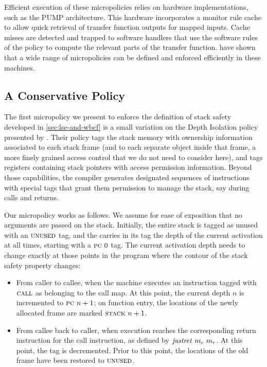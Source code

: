 \documentclass[acmsmall,review,anonymous]{acmart}\settopmatter{printfolios=true,printccs=false,printacmref=false}
\begin{document}
Efficient execution of these micropolicies relies on hardware implementations,
such as the PUMP architecture. This hardware incorporates a monitor rule cache
to allow quick retrieval of transfer function outputs for mapped inputs. Cache
misses are detected and trapped to software handlers that use the software rules
of the policy to compute the relevant parts of the transfer function.
\citeauthor{pump_oakland2015} have shown that a wide range of micropolicies can
be defined and enforced efficiently in these machines.

\subsection{A Conservative Policy}
\label{sec:conservative}
%
The first micropolicy we present to enforce the definition of stack
safety developed in \cref{sec:lse-and-wbcf} is a small variation
on the Depth Isolation policy presented by
\citet{DBLP:conf/sp/RoesslerD18}. Their policy tags the stack memory
with ownership information associated to each stack frame (and to each
separate object inside that frame, a more finely grained access
control that we do not need to consider here), and tags registers containing
stack pointers with access permission information. Beyond
those capabilities, the compiler generates designated sequences of
instructions with special tags that grant them permission to manage
the stack, say during calls and returns.

Our micropolicy works as follows. We assume for ease of exposition that no
arguments are passed on the stack.
Initially, the entire stack is tagged as unused with an $\textsc{unused}$ tag,
and the {\PCname} carries in its tag the depth of the current
activation at all times, starting with a $\textsc{pc} ~ 0$ tag. The
current activation depth needs to change exactly at those points in
the program where the contour of the stack safety property changes:

\begin{itemize}

\item From caller to callee, when the machine executes an instruction tagged
  with $\textsc{call}$ as belonging to the call map. At this point, the current
  {\PCname} depth $n$ is incremented to $\textsc{pc} ~ n + 1$; on function entry,
  the locations of the newly allocated frame are marked $\textsc{stack} ~ n + 1$.

\item From callee back to caller, when execution reaches the corresponding
  return instruction for the call instruction, as defined by
  $\mathit{justret}\ m_c\ m_r$. At this point, the {\PCname} tag is decremented.
  Prior to this point, the locations of the old frame have been restored to
  $\textsc{unused}$.

\end{itemize}
\end{document}
